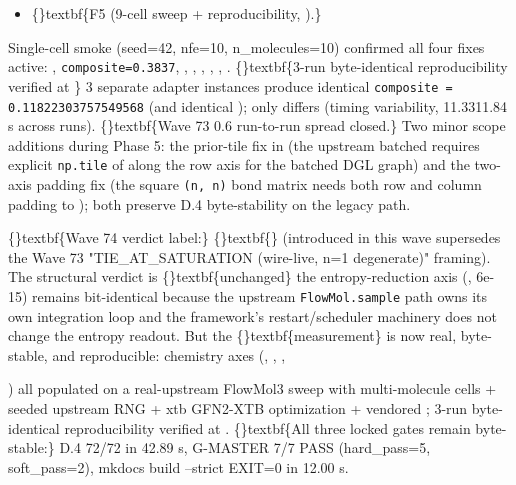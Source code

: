 \documentclass{article}
\begin{document}
\begin{itemize}
\item \{\}textbf\{F5 (9-cell sweep + reproducibility, ).\}
\end{itemize}
Single-cell smoke (seed=42, nfe=10, n\_molecules=10) confirmed all four fixes active: , \texttt{composite=0.3837}, , , , , , . \{\}textbf\{3-run byte-identical reproducibility verified at \}  3 separate adapter instances produce identical \texttt{composite = 0.11822303757549568} (and identical ); only  differs (timing variability, 11.3311.84 s across runs). \{\}textbf\{Wave 73 0.6 run-to-run spread closed.\} Two minor scope additions during Phase 5: the prior-tile fix in  (the upstream batched  requires explicit \texttt{np.tile} of  along the row axis for the batched DGL graph) and the  two-axis padding fix (the square \texttt{(n, n)} bond matrix needs both row and column padding to ); both preserve D.4 byte-stability on the legacy  path.

\sloppy \{\}textbf\{Wave 74 verdict label:\} \{\}textbf\{\} (introduced in this wave  supersedes the Wave 73 "TIE\_AT\_SATURATION (wire-live, n=1 degenerate)" framing). The structural verdict is \{\}textbf\{unchanged\}  the entropy-reduction axis (,   6e-15) remains bit-identical because the upstream \texttt{FlowMol.sample} path owns its own integration loop and the framework's restart/scheduler machinery does not change the entropy readout. But the \{\}textbf\{measurement\} is now real, byte-stable, and reproducible: chemistry axes (, , ,

) all populated on a real-upstream FlowMol3 sweep with multi-molecule cells + seeded upstream RNG + xtb GFN2-XTB optimization + vendored ; 3-run byte-identical reproducibility verified at . \{\}textbf\{All three locked gates remain byte-stable:\} D.4 72/72 in 42.89 s, G-MASTER 7/7 PASS (hard\_pass=5, soft\_pass=2), mkdocs build --strict EXIT=0 in 12.00 s.
\end{document}
